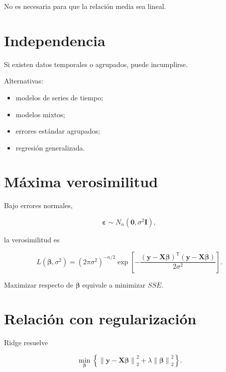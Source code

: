 \documentclass[
  spanish,
  10.5pt,
  letterpaper,
  DIV=11,
  numbers=noendperiod,
  oneside,
  open=any]{scrreprt}
\providecommand{\tightlist}{%
  \setlength{\itemsep}{0pt}\setlength{\parskip}{0pt}}
\theoremstyle{definition}
\theoremstyle{definition}
\theoremstyle{plain}
\theoremstyle{remark}
\begin{document}
No es necesaria para que la relación media sea lineal.

\section*{Independencia}\label{independencia-2}


Si existen datos temporales o agrupados, puede incumplirse.

Alternativas:

\begin{itemize}
\tightlist
\item
  modelos de series de tiempo;
\item
  modelos mixtos;
\item
  errores estándar agrupados;
\item
  regresión generalizada.
\end{itemize}

\section*{Máxima verosimilitud}\label{muxe1xima-verosimilitud}


Bajo errores normales,

\[
\boldsymbol{\varepsilon}
\sim
N_n(\mathbf{0},\sigma^2\mathbf{I}),
\]

la verosimilitud es

\[
L(
\boldsymbol{\beta},
\sigma^2
)
=
(2\pi\sigma^2)^{-n/2}
\exp
\left[
-\frac{
(\mathbf{y}-\mathbf{X}\boldsymbol{\beta})^{\mathsf T}
(\mathbf{y}-\mathbf{X}\boldsymbol{\beta})
}{
2\sigma^2
}
\right].
\]

Maximizar respecto de \(\boldsymbol{\beta}\) equivale a minimizar
\(SSE\).

\section*{Relación con
regularización}\label{relaciuxf3n-con-regularizaciuxf3n}


Ridge resuelve

\[
\min_{\boldsymbol{\beta}}
\left\{
\left\|
\mathbf{y}
-
\mathbf{X}\boldsymbol{\beta}
\right\|_2^2
+
\lambda
\left\|
\boldsymbol{\beta}
\right\|_2^2
\right\}.
\]
\end{document}
